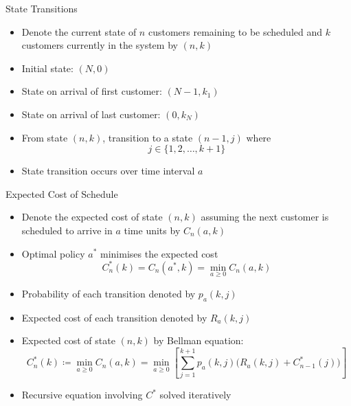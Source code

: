 \documentclass{beamer}
\begin{document}
\begin{frame}{State Transitions}
	\begin{itemize}
		\item Denote the current state of $n$ customers remaining to be scheduled and $k$ customers currently in the system by $(n, k)$
		\item Initial state: $(N, 0)$
		\item State on arrival of first customer: $(N - 1, k_{1})$
		\item State on arrival of last customer: $(0, k_{N})$
		\item From state $(n, k)$, transition to a state $(n - 1, j)$ where
		\begin{equation*}
			j \in \Big\{ 1, 2, \ldots, k + 1 \Big\}
		\end{equation*}
		\item State transition occurs over time interval $a$
	\end{itemize}
\end{frame}

\begin{frame}{Expected Cost of Schedule}
	\begin{itemize}
		\item Denote the expected cost of state $(n, k)$ assuming the next customer is scheduled to arrive in $a$ time units by $C_{n} (a, k)$
		\item Optimal policy $a^{*}$ minimises the expected cost
		\begin{equation*}
			C_{n}^{*} (k) = C_{n} (a^{*}, k) = \min_{a \geq 0} C_{n} (a, k)
		\end{equation*}
		\item Probability of each transition denoted by $p_{a} (k, j)$
		\item Expected cost of each transition denoted by $R_{a} (k, j)$
		\item Expected cost of state $(n, k)$ by \alert{Bellman equation}:
		\begin{equation*}
			C_{n}^{*} (k) \coloneqq \min_{a \geq 0} C_{n} (a, k) = \min_{a \geq 0} \left[ \sum_{j = 1}^{k + 1} p_{a} (k, j) \Big( R_{a} (k, j) + C_{n - 1}^{*} (j) \Big) \right]
		\end{equation*}
		\item Recursive equation involving $C^{*}$ solved iteratively
	\end{itemize}
\end{frame}
\end{document}
